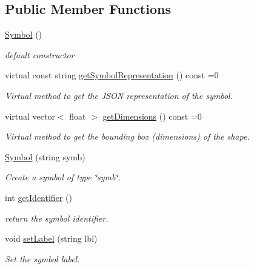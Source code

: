 \subsection*{Public Member Functions}
\begin{DoxyCompactItemize}
\item 
\hyperlink{classbridges_1_1datastructure_1_1_symbol_a6169106c021d20752abba3cd266ecfb0}{Symbol} ()
\begin{DoxyCompactList}\small\item\em default constructor \end{DoxyCompactList}\item 
virtual const string \hyperlink{classbridges_1_1datastructure_1_1_symbol_a8044b3da559dcd9de8510ae339f126c8}{get\+Symbol\+Representation} () const =0
\begin{DoxyCompactList}\small\item\em Virtual method to get the J\+S\+ON representation of the symbol. \end{DoxyCompactList}\item 
virtual vector$<$ float $>$ \hyperlink{classbridges_1_1datastructure_1_1_symbol_a5c1cb50770c4f4a2ff9c8642afc0d665}{get\+Dimensions} () const =0
\begin{DoxyCompactList}\small\item\em Virtual method to get the bounding box (dimensions) of the shape. \end{DoxyCompactList}\item 
\hyperlink{classbridges_1_1datastructure_1_1_symbol_adaeede160240bcc959d1813c5cb79528}{Symbol} (string symb)
\begin{DoxyCompactList}\small\item\em Create a symbol of type \char`\"{}symb\char`\"{}. \end{DoxyCompactList}\item 
int \hyperlink{classbridges_1_1datastructure_1_1_symbol_ac4b6cfcf91217d66ed0694080846970f}{get\+Identifier} ()
\begin{DoxyCompactList}\small\item\em return the symbol identifier. \end{DoxyCompactList}\item 
void \hyperlink{classbridges_1_1datastructure_1_1_symbol_a34609dd22e5043c39d40524d05e337b0}{set\+Label} (string lbl)
\begin{DoxyCompactList}\small\item\em Set the symbol label. \end{DoxyCompactList}\item 

\end{DoxyCompactItemize}
